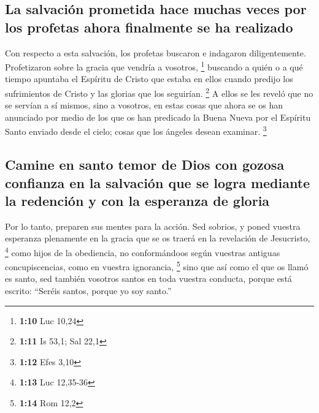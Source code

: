 \hypertarget{la-salvaciuxf3n-prometida-hace-muchas-veces-por-los-profetas-ahora-finalmente-se-ha-realizado}{%
\subsection{La salvación prometida hace muchas veces por los profetas
ahora finalmente se ha
realizado}\label{la-salvaciuxf3n-prometida-hace-muchas-veces-por-los-profetas-ahora-finalmente-se-ha-realizado}}

 Con respecto a esta salvación, los profetas buscaron e
indagaron diligentemente. Profetizaron sobre la gracia que vendría a
vosotros, \footnote{\textbf{1:10} Luc 10,24}  buscando a
quién o a qué tiempo apuntaba el Espíritu de Cristo que estaba en ellos
cuando predijo los sufrimientos de Cristo y las glorias que los
seguirían. \footnote{\textbf{1:11} Is 53,1; Sal 22,1}  A
ellos se les reveló que no se servían a sí mismos, sino a vosotros, en
estas cosas que ahora se os han anunciado por medio de los que os han
predicado la Buena Nueva por el Espíritu Santo enviado desde el cielo;
cosas que los ángeles desean examinar. \footnote{\textbf{1:12} Efes 3,10}

\hypertarget{camine-en-santo-temor-de-dios-con-gozosa-confianza-en-la-salvaciuxf3n-que-se-logra-mediante-la-redenciuxf3n-y-con-la-esperanza-de-gloria}{%
\subsection{Camine en santo temor de Dios con gozosa confianza en la
salvación que se logra mediante la redención y con la esperanza de
gloria}\label{camine-en-santo-temor-de-dios-con-gozosa-confianza-en-la-salvaciuxf3n-que-se-logra-mediante-la-redenciuxf3n-y-con-la-esperanza-de-gloria}}

 Por lo tanto, preparen sus mentes para la acción. Sed
sobrios, y poned vuestra esperanza plenamente en la gracia que se os
traerá en la revelación de Jesucristo, \footnote{\textbf{1:13} Luc
  12,35-36}  como hijos de la obediencia, no
conformándoos según vuestras antiguas concupiscencias, como en vuestra
ignorancia, \footnote{\textbf{1:14} Rom 12,2}  sino que
así como el que os llamó es santo, sed también vosotros santos en toda
vuestra conducta,  porque está escrito: ``Seréis santos,
porque yo soy santo.''

